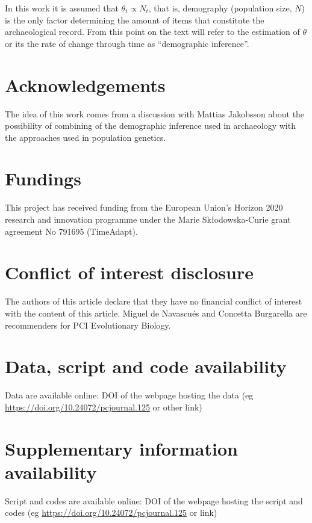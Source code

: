 \documentclass[a4paper]{article}
\begin{document}
In this work it is assumed that $\theta_t \propto N_t$, that is, demography (population size, $N$) is the only factor determining the amount of items that constitute the archaeological record. From this point on the text will refer to the estimation of $\theta$ or its the rate of change through time as ``demographic inference''.




\section*{\centering Acknowledgements}

The idea of this work comes from a discussion with Mattias Jakobsson about the possibility of combining of the demographic inference used in archaeology with the approaches used in population genetics.

\section*{\centering Fundings}

This project has received funding from the European Union’s Horizon 2020 research and innovation programme under the Marie Skłodowska-Curie grant agreement No 791695 (TimeAdapt).

\section*{\centering Conflict of interest disclosure}

The authors of this article declare that they have no financial conflict of interest with the content of this article. Miguel de Navascués and Concetta Burgarella are recommenders for PCI Evolutionary Biology.

\section*{\centering Data, script and code availability}

Data are available online: DOI of the webpage hosting the data (eg \url{https://doi.org/10.24072/pcjournal.125} or other link)

\section*{\centering Supplementary information availability}

Script and codes are available online: DOI of the webpage hosting the script and codes (eg \url{https://doi.org/10.24072/pcjournal.125} or link)
\end{document}
